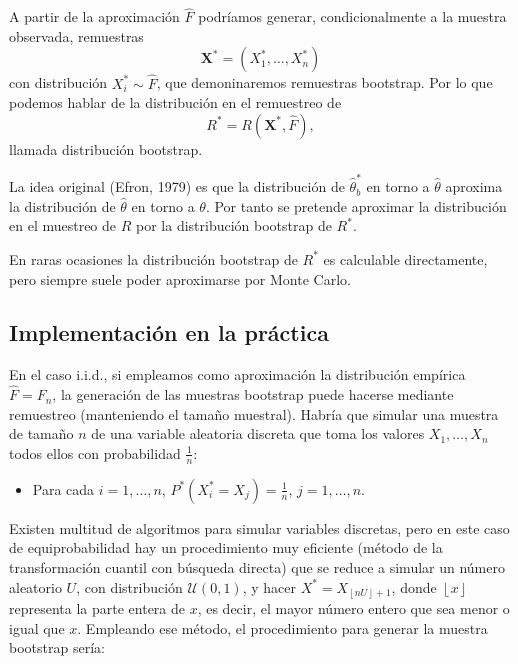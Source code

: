 \documentclass[]{book}
\providecommand{\tightlist}{%
  \setlength{\itemsep}{0pt}\setlength{\parskip}{0pt}}
\theoremstyle{definition}
\theoremstyle{definition}
\theoremstyle{definition}
\theoremstyle{remark}
\begin{document}
A partir de la aproximación \(\hat{F}\) podríamos generar,
condicionalmente a la muestra observada, remuestras
\[\mathbf{X}^{\ast}=\left( X_1^{\ast},\ldots ,X_n^{\ast} \right)\] con
distribución \(X_i^{\ast} \sim \hat{F}\), que demoninaremos remuestras
bootstrap. Por lo que podemos hablar de la distribución en el remuestreo
de \[R^{\ast}=R\left( \mathbf{X}^{\ast},\hat{F} \right),\] llamada
distribución bootstrap.

La idea original (Efron, 1979) es que la distribución de
\(\hat{\theta}_{b}^{\ast }\) en torno a \(\hat{\theta}\) aproxima la
distribución de \(\hat{\theta}\) en torno a \(\theta\). Por tanto se
pretende aproximar la distribución en el muestreo de \(R\) por la
distribución bootstrap de \(R^{\ast}\).

En raras ocasiones la distribución bootstrap de \(R^{\ast}\) es
calculable directamente, pero siempre suele poder aproximarse por Monte
Carlo.

\subsection{Implementación en la práctica}\label{cap1-implementacion}

En el caso i.i.d., si empleamos como aproximación la distribución
empírica \(\hat{F}=F_n\), la generación de las muestras bootstrap puede
hacerse mediante remuestreo (manteniendo el tamaño muestral). Habría que
simular una muestra de tamaño \(n\) de una variable aleatoria discreta
que toma los valores \(X_1,\ldots ,X_n\) todos ellos con probabilidad
\(\frac{1}{n}\):

\begin{itemize}
\tightlist
\item
  Para cada \(i=1,\ldots, n\),
  \(P^{\ast}\left( X_i^{\ast}=X_j \right) =  \frac{1}{n}\),
  \(j=1,\ldots ,n\).
\end{itemize}

Existen multitud de algoritmos para simular variables discretas, pero en
este caso de equiprobabilidad hay un procedimiento muy eficiente (método
de la transformación cuantil con búsqueda directa) que se reduce a
simular un número aleatorio \(U\), con distribución
\(\mathcal{U}\left( 0,1 \right)\), y hacer
\(X^{\ast}=X_{\left\lfloor nU\right\rfloor +1}\), donde
\(\left\lfloor x\right\rfloor\) representa la parte entera de \(x\), es
decir, el mayor número entero que sea menor o igual que \(x\). Empleando
ese método, el procedimiento para generar la muestra bootstrap sería:
\end{document}
